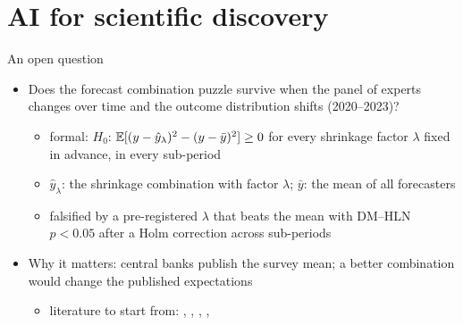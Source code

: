 \section{AI for scientific discovery}

\begin{frame}{An open question}
\itemsize{\small}
\begin{itemize}
    \item Does the forecast combination puzzle survive when the panel of experts changes over time and the outcome distribution shifts (2020--2023)?
    \begin{itemize}
        \item formal: $H_0$: $\mathbb{E}[(y - \hat y_{\lambda})^2 - (y - \bar y)^2] \ge 0$ for every shrinkage factor $\lambda$ fixed in advance, in every sub-period
        \item $\hat y_\lambda$: the shrinkage combination with factor $\lambda$; $\bar y$: the mean of all forecasters
        \item falsified by a pre-registered $\lambda$ that beats the mean with DM--HLN $p < 0.05$ after a Holm correction across sub-periods
    \end{itemize}
    \item Why it matters: central banks publish the survey mean; a better combination would change the published expectations
    \begin{itemize}
        \item literature to start from: , , , , 
    \end{itemize}
\end{itemize}
\end{frame}

